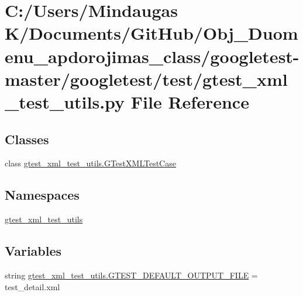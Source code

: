 \hypertarget{googletest-master_2googletest_2test_2gtest__xml__test__utils_8py}{}\section{C\+:/\+Users/\+Mindaugas K/\+Documents/\+Git\+Hub/\+Obj\+\_\+\+Duomenu\+\_\+apdorojimas\+\_\+class/googletest-\/master/googletest/test/gtest\+\_\+xml\+\_\+test\+\_\+utils.py File Reference}
\label{googletest-master_2googletest_2test_2gtest__xml__test__utils_8py}
\subsection*{Classes}
\begin{DoxyCompactItemize}
\item 
class \mbox{\hyperlink{classgtest__xml__test__utils_1_1_g_test_x_m_l_test_case}{gtest\+\_\+xml\+\_\+test\+\_\+utils.\+G\+Test\+X\+M\+L\+Test\+Case}}
\end{DoxyCompactItemize}
\subsection*{Namespaces}
\begin{DoxyCompactItemize}
\item 
 \mbox{\hyperlink{namespacegtest__xml__test__utils}{gtest\+\_\+xml\+\_\+test\+\_\+utils}}
\end{DoxyCompactItemize}
\subsection*{Variables}
\begin{DoxyCompactItemize}
\item 
string \mbox{\hyperlink{namespacegtest__xml__test__utils_aebe969ed368778716d0619214ff7b853}{gtest\+\_\+xml\+\_\+test\+\_\+utils.\+G\+T\+E\+S\+T\+\_\+\+D\+E\+F\+A\+U\+L\+T\+\_\+\+O\+U\+T\+P\+U\+T\+\_\+\+F\+I\+LE}} = \textquotesingle{}test\+\_\+detail.\+xml\textquotesingle{}
\end{DoxyCompactItemize}
